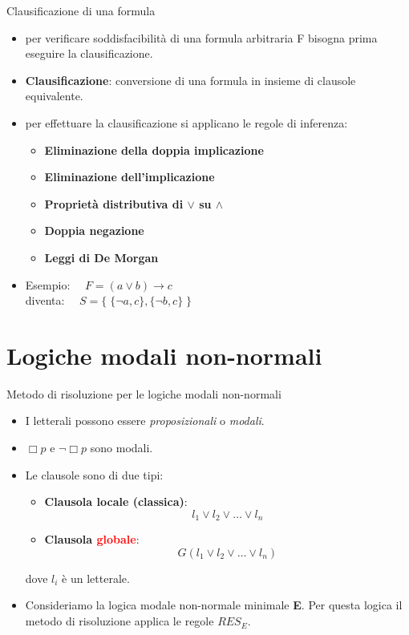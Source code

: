 \documentclass{beamer}
\begin{document}
\begin{frame}{Clausificazione di una formula}
    \begin{itemize}
        \item per verificare soddisfacibilità di una formula arbitraria F bisogna prima eseguire la clausificazione.
        \item \textbf{Clausificazione}: conversione di una formula in insieme di clausole equivalente.
        \item per effettuare la clausificazione si applicano le regole di inferenza:
        \begin{itemize}
            \item \textbf{Eliminazione della doppia implicazione}
            \item \textbf{Eliminazione dell'implicazione}
            \item \textbf{Proprietà distributiva di $\lor$ su $\land$}
            \item \textbf{Doppia negazione}
            \item \textbf{Leggi di De Morgan}
        \end{itemize}
        \item Esempio: $\quad F = (a \lor b) \to c$ \\diventa: $\quad S = \{ \; \{\lnot a, c\}, \{\lnot b, c\} \; \}$
    \end{itemize}
    
\end{frame}

\section{Logiche modali non-normali}
\begin{frame}{Metodo di risoluzione per le logiche modali non-normali}
    \begin{itemize}
        \item I letterali possono essere \emph{proposizionali} o \emph{modali}. 
        \item $\Box p$ e $\lnot \Box p$ sono modali.
        \item Le clausole sono di due tipi:
        \begin{itemize}
            \item \textbf{Clausola locale (classica)}: \[ l_1 \lor l_2 \lor \ldots \lor l_n \]
            \item \textbf{Clausola \textcolor{red}{globale}}: \[ G(l_1 \lor l_2 \lor \ldots \lor l_n) \]
        \end{itemize}
        dove $l_i$ è un letterale.
        \item Consideriamo la logica modale non-normale minimale \textbf{E}. Per questa logica il metodo di risoluzione applica le regole $RES_E$. 
    \end{itemize}

\end{frame}
\end{document}
